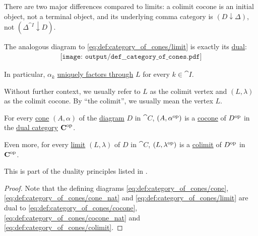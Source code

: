 \begin{definition}
\begin{thmenum}
    There are two major differences compared to limits: a colimit cocone is an initial object, not a terminal object, and its underlying comma category is \( (D \downarrow \Delta) \), not \( (\Delta^{\cat{I}} \downarrow D) \).

    The analogous diagram to \eqref{eq:def:category_of_cones/limit} is exactly its \hyperref[thm:categorical_principle_of_duality]{dual}:
    \begin{equation}\label{eq:def:category_of_cones/colimit}
      \begin{aligned}
        \texttt{[image: output/def\_\_category\_of\_cones.pdf]}
      \end{aligned}
    \end{equation}

    In particular, \( \alpha_k \) \hyperref[def:factors_through]{uniquely factors through} \( L \) for every \( k \in \cat{I} \).

    Without further context, we usually refer to \( L \) as the colimit vertex and \( (L, \lambda) \) as the colimit cocone. By \enquote{the colimit}, we usually mean the vertex \( L \).
  \end{thmenum}
\end{definition}

\begin{proposition}\label{thm:categorical_limit_duality}
  For every \hyperref[def:category_of_cones/cone]{cone} \( (A, \alpha) \) of the \hyperref[def:categorical_diagram]{diagram} \( D \) in \( \cat{C} \), \( (A, \alpha^{\operatorname{op}}) \) is a \hyperref[def:category_of_cones/cone]{cocone} of \( D^{\operatorname{op}} \) in the \hyperref[def:dual_category]{dual category} \( \operatorname{\mathbf{C}}^{\operatorname{op}} \).

  Even more, for every \hyperref[def:category_of_cones/limit]{limit} \( (L, \lambda) \) of \( D \) in \( \cat{C} \), \( (L, \lambda^{\operatorname{op}}) \) is a \hyperref[def:category_of_cones/colimit]{colimit} of \( D^{\operatorname{op}} \) in \( \operatorname{\mathbf{C}}^{\operatorname{op}} \).

  This is part of the duality principles listed in .
\end{proposition}
\begin{proof}
  Note that the defining diagrams \eqref{eq:def:category_of_cones/cone}, \eqref{eq:def:category_of_cones/cone_nat} and \eqref{eq:def:category_of_cones/limit} are dual to \eqref{eq:def:category_of_cones/cocone}, \eqref{eq:def:category_of_cones/cocone_nat} and \eqref{eq:def:category_of_cones/colimit}.
\end{proof}

